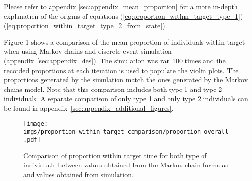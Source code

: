 Please refer to appendix \ref{sec:appendix_mean_proportion} for a more in-depth 
explanation of the origins of equations 
(\ref{eq:proportion_within_target_type_1}) - 
(\ref{eq:proportion_within_target_type_2_from_state}).

Figure \ref{fig:markov_vs_des_proportion_comparison_overall} shows a comparison
of the mean proportion of individuals within target when using Markov chains 
and discrete event simulation (appendix~\ref{sec:appendix_des}).
The simulation was ran 100 times and the recorded proportions at each iteration 
is used to populate the violin plots.
The proportions generated by the simulation match the ones generated by the 
Markov chains model.
Note that this comparison includes both type 1 and type 2 individuals.
A separate comparison of only type 1 and only type 2 individuals can be found 
in appendix~\ref{sec:appendix_additional_figures}.

\begin{figure}[H]
    \centering
    \texttt{[image: imgs/proportion\_within\_target\_comparison/proportion\_overall.pdf]}
    \caption{
        Comparison of proportion within target time for both type of 
        individuals between values obtained from the Markov chain formulas 
        and values obtained from simulation. 
    }
    \label{fig:markov_vs_des_proportion_comparison_overall}
\end{figure}
